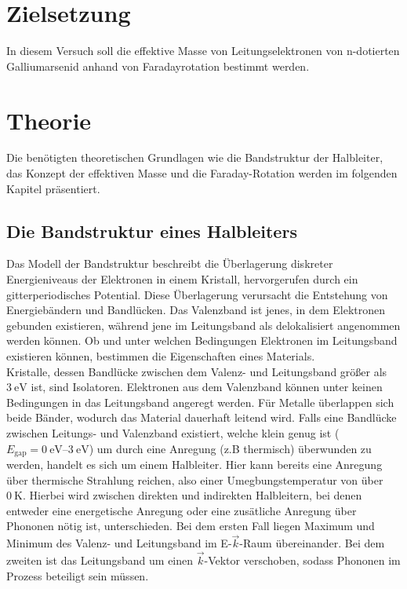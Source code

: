 \chapter{Zielsetzung}
\label{cha:zielsetzung}
In diesem Versuch soll die effektive Masse von Leitungselektronen von n-dotierten Galliumarsenid anhand von Faradayrotation bestimmt werden.

\chapter{Theorie}
\label{cha:Theorie}
Die benötigten theoretischen Grundlagen wie die Bandstruktur der Halbleiter, das Konzept der effektiven Masse und die Faraday-Rotation werden im folgenden Kapitel präsentiert.
\section{Die Bandstruktur eines Halbleiters}
Das Modell der Bandstruktur beschreibt die Überlagerung diskreter Energieniveaus der Elektronen in einem Kristall, hervorgerufen durch
ein gitterperiodisches Potential. Diese Überlagerung verursacht die Entstehung von Energiebändern und Bandlücken. Das Valenzband ist jenes, in dem Elektronen gebunden existieren,
während jene im Leitungsband als delokalisiert angenommen werden können. Ob und unter welchen Bedingungen Elektronen im Leitungsband existieren können,
bestimmen die Eigenschaften eines Materials.\\
Kristalle, dessen Bandlücke zwischen dem Valenz- und Leitungsband größer als $\qty{3}{\electronvolt}$ \cite{bandluecke} ist, sind Isolatoren. Elektronen aus dem Valenzband können unter keinen Bedingungen in 
das Leitungsband angeregt werden. Für Metalle überlappen sich beide Bänder, wodurch das Material dauerhaft leitend wird. Falls eine Bandlücke zwischen 
Leitungs- und Valenzband existiert, welche klein genug ist ($E_{\text{gap}}=\qtyrange{0}{3}{\electronvolt}$)\cite{bandluecke} um durch eine Anregung (z.B thermisch) überwunden zu werden, handelt es sich um einem Halbleiter. 
Hier kann bereits eine Anregung über thermische Strahlung reichen, also einer Umegbungstemperatur von über $\qty{0}{\kelvin}$.
Hierbei wird zwischen direkten und indirekten Halbleitern, bei denen entweder eine energetische Anregung oder eine zusätliche Anregung über Phononen nötig ist, unterschieden. Bei dem ersten Fall liegen Maximum und
Minimum des Valenz- und Leitungsband im E-$\vec{k}$-Raum übereinander. Bei dem zweiten ist das Leitungsband um einen $\vec{k}$-Vektor verschoben, sodass Phononen im Prozess beteiligt sein müssen.
